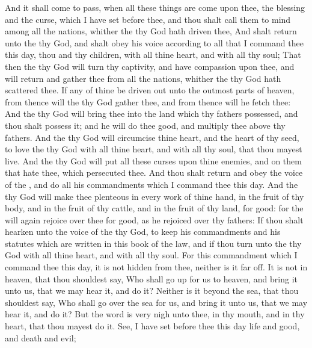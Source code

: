 \begin{biblechapter} %
 And it shall come to pass, when all these things are come upon thee, the blessing and the curse, which I have set before thee, and thou shalt call them to mind among all the nations, whither the \LORD thy God hath driven thee,
\verse And shalt return unto the \LORD thy God, and shalt obey his voice according to all that I command thee this day, thou and thy children, with all thine heart, and with all thy soul;
\verse That then the \LORD thy God will turn thy captivity, and have compassion upon thee, and will return and gather thee from all the nations, whither the \LORD thy God hath scattered thee.
\verse If any of thine be driven out unto the outmost parts of heaven, from thence will the \LORD thy God gather thee, and from thence will he fetch thee:
\verse And the \LORD thy God will bring thee into the land which thy fathers possessed, and thou shalt possess it; and he will do thee good, and multiply thee above thy fathers.
\verse And the \LORD thy God will circumcise thine heart, and the heart of thy seed, to love the \LORD thy God with all thine heart, and with all thy soul, that thou mayest live.
\verse And the \LORD thy God will put all these curses upon thine enemies, and on them that hate thee, which persecuted thee.
\verse And thou shalt return and obey the voice of the \LORD, and do all his commandments which I command thee this day.
\verse And the \LORD thy God will make thee plenteous in every work of thine hand, in the fruit of thy body, and in the fruit of thy cattle, and in the fruit of thy land, for good: for the \LORD will again rejoice over thee for good, as he rejoiced over thy fathers:
\verse If thou shalt hearken unto the voice of the \LORD thy God, to keep his commandments and his statutes which are written in this book of the law, and if thou turn unto the \LORD thy God with all thine heart, and with all thy soul.
 For this commandment which I command thee this day, it is not hidden from thee, neither is it far off.
\verse It is not in heaven, that thou shouldest say, Who shall go up for us to heaven, and bring it unto us, that we may hear it, and do it?
\verse Neither is it beyond the sea, that thou shouldest say, Who shall go over the sea for us, and bring it unto us, that we may hear it, and do it?
\verse But the word is very nigh unto thee, in thy mouth, and in thy heart, that thou mayest do it.
\verse See, I have set before thee this day life and good, and death and evil;

\end{biblechapter}
